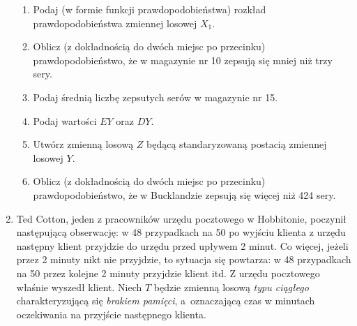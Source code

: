 \documentclass[twoside]{mwart}
\begin{document}
\begin{enumerate}
\begin{enumerate}
\item Podaj  (w formie funkcji prawdopodobieństwa) rozkład prawdopodobieństwa zmiennej losowej $X_1$.
\item Oblicz (z dokładnością do dwóch miejsc po przecinku) prawdopodobieństwo, że w magazynie nr 10 zepsują się mniej niż trzy sery.
\item Podaj średnią liczbę zepsutych serów w magazynie nr 15.
\item Podaj wartości $EY$ oraz $DY$.
\item Utwórz zmienną losową $Z$ będącą standaryzowaną postacią zmiennej losowej $Y$.
\item Oblicz (z dokładnością do dwóch miejsc po przecinku) prawdopodobieństwo, że w Bucklandzie zepsują się więcej niż 424 sery.
\end{enumerate}

\item Ted Cotton, jeden z pracowników urzędu pocztowego w Hobbitonie, poczynił następującą obserwację: w 48 przypadkach na 50 po wyjściu klienta z urzędu następny klient przyjdzie do urzędu przed upływem 2 minut.
Co więcej, jeżeli przez 2 minuty nikt nie przyjdzie, to sytuacja się powtarza: w 48 przypadkach na 50 przez kolejne 2 minuty przyjdzie klient itd.
Z urzędu pocztowego właśnie wyszedł klient.
Niech $T$ będzie zmienną losową \emph{typu ciągłego} charakteryzującą się \emph{brakiem pamięci}, a~oznaczającą czas w minutach oczekiwania na przyjście następnego klienta.


\end{enumerate}
\end{document}
